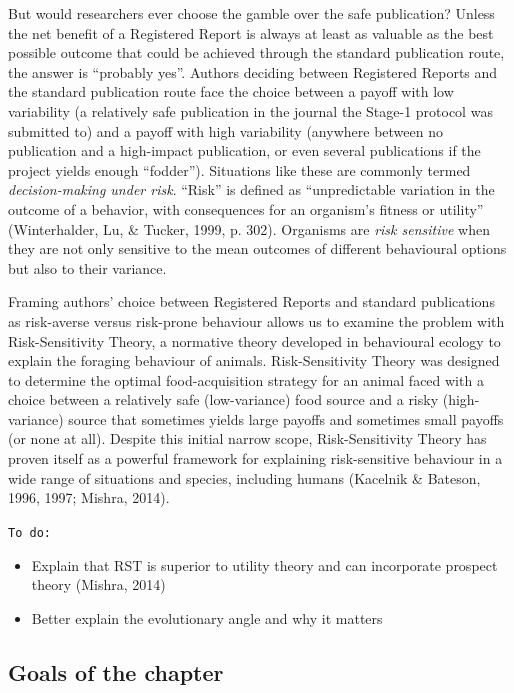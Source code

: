 \documentclass[british,,man,mask,floatsintext]{apa6}
\providecommand{\tightlist}{%
  \setlength{\itemsep}{0pt}\setlength{\parskip}{0pt}}
\begin{document}
But would researchers ever choose the gamble over the safe publication?
Unless the net benefit of a Registered Report is always at least as valuable as the best possible outcome that could be achieved through the standard publication route, the answer is \enquote{probably yes}.
Authors deciding between Registered Reports and the standard publication route face the choice between a payoff with low variability (a relatively safe publication in the journal the Stage-1 protocol was submitted to) and a payoff with high variability (anywhere between no publication and a high-impact publication, or even several publications if the project yields enough \enquote{fodder}).
Situations like these are commonly termed \emph{decision-making under risk}.
\enquote{Risk} is defined as \enquote{unpredictable variation in the outcome of a behavior, with consequences for an organism's fitness or utility} (Winterhalder, Lu, \& Tucker, 1999, p. 302).
Organisms are \emph{risk sensitive} when they are not only sensitive to the mean outcomes of different behavioural options but also to their variance.

Framing authors' choice between Registered Reports and standard publications as risk-averse versus risk-prone behaviour allows us to examine the problem with Risk-Sensitivity Theory, a normative theory developed in behavioural ecology to explain the foraging behaviour of animals.
Risk-Sensitivity Theory was designed to determine the optimal food-acquisition strategy for an animal faced with a choice between a relatively safe (low-variance) food source and a risky (high-variance) source that sometimes yields large payoffs and sometimes small payoffs (or none at all).
Despite this initial narrow scope, Risk-Sensitivity Theory has proven itself as a powerful framework for explaining risk-sensitive behaviour in a wide range of situations and species, including humans (Kacelnik \& Bateson, 1996, 1997; Mishra, 2014).

\texttt{To\ do:}

\begin{itemize}
\tightlist
\item
  Explain that RST is superior to utility theory and can incorporate prospect theory (Mishra, 2014)
\item
  Better explain the evolutionary angle and why it matters
\end{itemize}

\hypertarget{goals-of-the-chapter}{%
\subsection{Goals of the chapter}\label{goals-of-the-chapter}}
\end{document}
